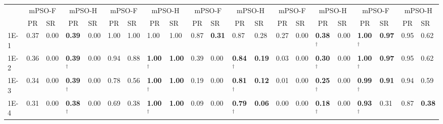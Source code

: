 \begin{table*}[h]
{\begin{tabular}{|p{4.8mm}|p{4.6mm}|p{4.6mm}|p{4.6mm}|p{4.6mm}|p{4.6mm}|p{4.6mm}|p{4.6mm}|p{4.6mm}|p{4.6mm}|p{4.6mm}|p{4.6mm}|p{4.6mm}|p{4.6mm}|p{4.6mm}|p{4.6mm}|p{4.6mm}|p{4.6mm}|p{4.6mm}|p{4.6mm}|p{4.6mm}|}
    \cline{2-21}
    & \multicolumn{2}{c|}{mPSO-F} & \multicolumn{2}{c|}{mPSO-H} & \multicolumn{2}{c|}{mPSO-F} & \multicolumn{2}{c|}{mPSO-H} & \multicolumn{2}{c|}{mPSO-F} & \multicolumn{2}{c|}{mPSO-H} & \multicolumn{2}{c|}{mPSO-F} & \multicolumn{2}{c|}{mPSO-H} & \multicolumn{2}{c|}{mPSO-F} & \multicolumn{2}{c|}{mPSO-H} \\

    \cline{2-21}
     & \multicolumn{1}{c|}{PR} & SR & \multicolumn{1}{c|}{PR} & SR & \multicolumn{1}{c|}{PR} & SR & \multicolumn{1}{c|}{PR} & SR & \multicolumn{1}{c|}{PR} & SR & \multicolumn{1}{c|}{PR} & SR & \multicolumn{1}{c|}{PR} & SR & \multicolumn{1}{c|}{PR} & SR & \multicolumn{1}{c|}{PR} & SR & \multicolumn{1}{c|}{PR} & SR \\
    \hline
    1E-1 & 0.37 & 0.00 & \textcolor{customblue}{\textbf{0.39}} & 0.00 & 1.00 & 1.00 & 1.00 & 1.00 & 0.87 & \textcolor{customred}{\textbf{0.31}} & 0.87 & 0.28 & 0.27 & 0.00 & \textcolor{customblue}{\textbf{0.38$^\dagger$}} & 0.00 & \textcolor{customred}{\textbf{1.00$^\dagger$}} & \textcolor{customred}{\textbf{0.97}} & 0.95 & 0.62 \\
    1E-2 & 0.36 & 0.00 & \textcolor{customblue}{\textbf{0.39$^\dagger$}} & 0.00 & 0.94 & 0.88 & \textcolor{customblue}{\textbf{1.00$^\dagger$}} & \textcolor{customblue}{\textbf{1.00}} & 0.39 & 0.00 & \textcolor{customblue}{\textbf{0.84$^\dagger$}} & \textcolor{customblue}{\textbf{0.19}} & 0.03 & 0.00 & \textcolor{customblue}{\textbf{0.30$^\dagger$}} & 0.00 & \textcolor{customred}{\textbf{1.00$^\dagger$}} & \textcolor{customred}{\textbf{0.97}} & 0.95 & 0.62 \\
    1E-3 & 0.34 & 0.00 & \textcolor{customblue}{\textbf{0.39$^\dagger$}} & 0.00 & 0.78 & 0.56 & \textcolor{customblue}{\textbf{1.00$^\dagger$}} & \textcolor{customblue}{\textbf{1.00}} & 0.19 & 0.00 & \textcolor{customblue}{\textbf{0.81$^\dagger$}} & \textcolor{customblue}{\textbf{0.12}} & 0.01 & 0.00 & \textcolor{customblue}{\textbf{0.25$^\dagger$}} & 0.00 & \textcolor{customred}{\textbf{0.99$^\dagger$}} & \textcolor{customred}{\textbf{0.91}} & 0.94 & 0.59 \\
    1E-4 & 0.31 & 0.00 & \textcolor{customblue}{\textbf{0.38$^\dagger$}} & 0.00 & 0.69 & 0.38 & \textcolor{customblue}{\textbf{1.00$^\dagger$}} & \textcolor{customblue}{\textbf{1.00}} & 0.09 & 0.00 & \textcolor{customblue}{\textbf{0.79$^\dagger$}} & \textcolor{customblue}{\textbf{0.06}} & 0.00 & 0.00 & \textcolor{customblue}{\textbf{0.18$^\dagger$}} & 0.00 & \textcolor{customred}{\textbf{0.93$^\dagger$}} & 0.31 & 0.87 & \textcolor{customblue}{\textbf{0.38}} \\

\end{tabular}}
\end{table*}
